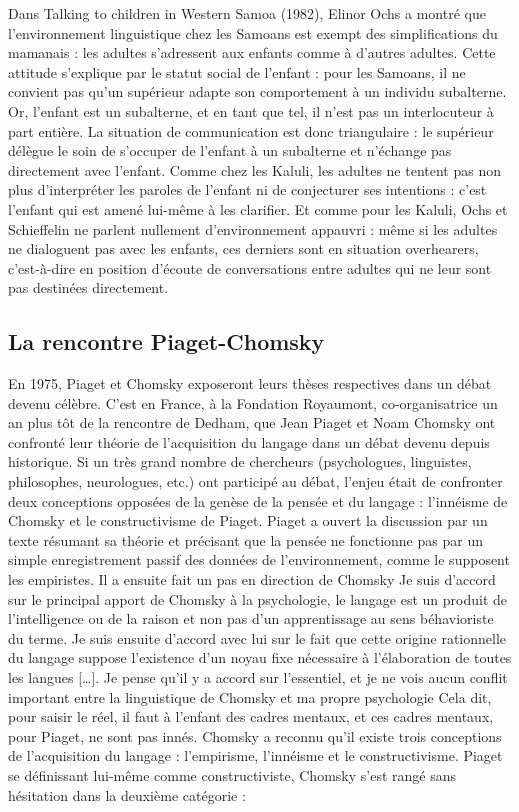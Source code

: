 Dans Talking to children in Western Samoa (1982), Elinor Ochs a montré que l’environnement
linguistique chez les Samoans est exempt des simplifications du mamanais : les adultes
s'adressent aux enfants comme à d'autres adultes. Cette attitude s'explique par le statut social
de l'enfant : pour les Samoans, il ne convient pas qu'un supérieur adapte son comportement
à un individu subalterne. Or, l'enfant est un subalterne, et en tant que tel, il n’est pas un
interlocuteur à part entière. La situation de communication est donc triangulaire : le supérieur
délègue le soin de s'occuper de l'enfant à un subalterne et n’échange pas directement avec
l'enfant. Comme chez les Kaluli, les adultes ne tentent pas non plus d'interpréter les paroles
de l'enfant ni de conjecturer ses intentions : c'est l'enfant qui est amené lui-même à les
clarifier. Et comme pour les Kaluli, Ochs et Schieffelin ne parlent nullement d'environnement
appauvri : même si les adultes ne dialoguent pas avec les enfants, ces derniers sont en situation
overhearers, c'est-à-dire en position d'écoute de conversations entre adultes qui ne leur sont
pas destinées directement.
\subsection{La rencontre Piaget-Chomsky}
En 1975, Piaget et Chomsky exposeront leurs thèses respectives dans un débat devenu célèbre. C’est
en France, à la Fondation Royaumont, co-organisatrice un an plus tôt de la rencontre de Dedham, que
Jean Piaget et Noam Chomsky ont confronté leur théorie de l'acquisition du langage dans un débat
devenu depuis historique.
Si un très grand nombre de chercheurs (psychologues, linguistes, philosophes, neurologues, etc.)
ont participé au débat, l'enjeu était de confronter deux conceptions opposées de la genèse de la
pensée et du langage : l'innéisme de Chomsky et le constructivisme de Piaget. Piaget a ouvert la
discussion par un texte résumant sa théorie et précisant que la pensée ne fonctionne pas par un
simple enregistrement passif des données de l'environnement, comme le supposent les empiristes.
Il a ensuite fait un pas en direction de Chomsky
Je suis d'accord sur le principal apport de Chomsky à la psychologie, le langage est un produit
de l'intelligence ou de la raison et non pas d'un apprentissage au sens béhavioriste du terme.
Je suis ensuite d'accord avec lui sur le fait que cette origine rationnelle du langage suppose
l'existence d'un noyau fixe nécessaire à l'élaboration de toutes les langues […]. Je pense qu'il y
a accord sur l'essentiel, et je ne vois aucun conflit important entre la linguistique de Chomsky et
ma propre psychologie
Cela dit, pour saisir le réel, il faut à l'enfant des cadres mentaux, et ces cadres mentaux, pour
Piaget, ne sont pas innés. Chomsky a reconnu qu'il existe trois conceptions de l'acquisition du
langage : l’empirisme, l’innéisme et le constructivisme. Piaget se définissant lui-même comme
constructiviste, Chomsky s’est rangé sans hésitation dans la deuxième catégorie :

